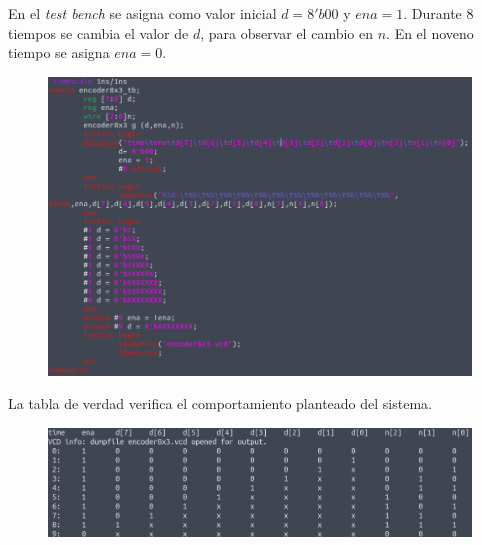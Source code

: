 \documentclass[11pt,a4paper]{article}
\begin{document}
\begin{enumerate}
En el \textit{test bench} se asigna como valor inicial $d=8'b00$ y $ena=1$. Durante 8 tiempos se cambia el valor de $d$, para observar el cambio en $n$. En el noveno tiempo se asigna $ena=0$.
\begin{figure}[h!]
\centering
\includegraphics[scale=0.4]{encoder8x3_2.png} 
\end{figure}

La tabla de verdad verifica el comportamiento planteado del sistema.
\begin{figure}[h!]
\centering
\includegraphics[scale=0.4]{encoder8x3_3.png} 
\end{figure}
\pagebreak


\end{enumerate}
\end{document}
